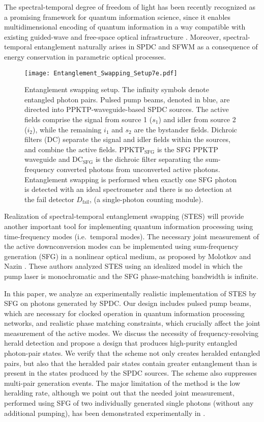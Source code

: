 \documentclass[twocolumn,amssymb, nobibnotes, showpacs, aps, pra,10pt]{revtex4-1}
\begin{document}
The spectral-temporal degree of freedom of light has been recently recognized as a promising framework for quantum information science, since it enables multidimensional encoding of quantum information in a way compatible with existing guided-wave and free-space optical infrastructure \cite{Humphreys2013,Nunn2013,Roslund2014,Kowligy2014,Donohue2014,Brecht2015,Lukens2017,Wright2017,Karpinski2017,Kues2017,Villegas2017,FiberEntanglement}.   
Moreover, spectral-temporal entanglement naturally arises in SPDC and SFWM as a consequence of energy conservation in parametric optical processes.

\begin{figure*}[t!]
\centerline{\texttt{[image: Entanglement\_Swapping\_Setup7e.pdf]}}
\caption{Entanglement swapping setup. The infinity symbols denote entangled photon pairs. Pulsed pump beams, denoted in blue, are directed into PPKTP-waveguide-based SPDC sources.  The active fields comprise the signal from source 1 ($s_1$) and idler from source 2 ($i_2$), while the remaining $i_1$ and $s_2$ are the bystander fields. Dichroic filters (DC) separate the signal and idler fields within the sources, and combine the active fields. $\text{PPKTP}_{\text{SFG}}$ is the SFG PPKTP waveguide and $\text{DC}_{\text{SFG}}$ is the dichroic filter separating the sum-frequency converted photons from unconverted active photons. Entanglement swapping is performed when exactly one SFG photon is detected with an ideal spectrometer and there is no detection at the fail detector $D_{\mathrm{fail}}$, (a single-photon counting module).} \label{fig:setup}
\end{figure*}

Realization of spectral-temporal entanglement swapping (STES) will provide another important tool for implementing quantum information processing using time-frequency modes (i.e.\ temporal modes). The necessary joint measurement of the active downconversion modes can be implemented using sum-frequency generation (SFG) in a nonlinear optical medium, as proposed by Molotkov and Nazin \cite{Molotkov1999}.  These authors analyzed STES using an idealized model in which the pump laser is monochromatic and the SFG phase-matching bandwidth is infinite.

In this paper, we analyze an experimentally realistic implementation of STES by SFG on photons generated by SPDC. Our design includes pulsed pump beams, which are necessary for clocked operation in quantum information processing networks, and realistic phase matching constraints, which crucially affect the joint measurement of the active modes.  We discuss the necessity of frequency-resolving herald detection and propose a design that produces high-purity entangled photon-pair states. We verify that the scheme not only creates heralded entangled pairs, but also that the heralded pair states contain greater entanglement than is present in the states produced by the SPDC sources. The scheme also suppresses multi-pair generation events. The major limitation of the method is the low heralding rate, although we point out that the needed joint measurement, performed using SFG of two individually generated single photons (without any additional pumping), has been demonstrated experimentally in \cite{Guerreiro2014}.
\end{document}
